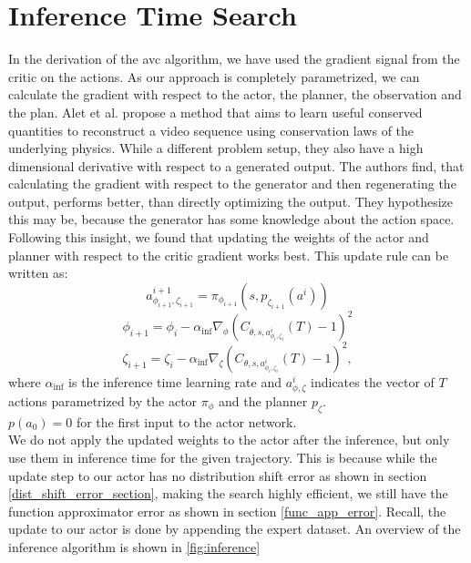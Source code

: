 \section{Inference Time Search}
\label{sec:inf_time_search}
In the derivation of the \ac{avc} algorithm, we have used the gradient signal from the critic on the actions. As our approach is completely parametrized, we can calculate 
the gradient with respect to the actor, the planner, the observation and the plan. Alet et al. \cite{alet2021noether} propose a method that aims 
to learn useful conserved quantities to reconstruct a video sequence 
using conservation laws of the underlying physics. While a different problem setup, they also have a high dimensional derivative with respect to a 
generated output. The authors find, that 
calculating the gradient with respect to the generator and then regenerating the output, performs better, than directly optimizing the output. They hypothesize this 
may be, because the generator has some knowledge about the action space. Following this insight, we found that updating the weights of the actor and planner 
with respect to the critic gradient works best. This update rule can be written as:
\begin{equation*}
    a^{i+1}_{\phi_{i+1}, \zeta_{i+1}} = \pi_{\phi_{i+1}}(s, p_{\zeta_{i+1}}(a^i))
\end{equation*}
\begin{equation*}
    \phi_{i+1} = \phi_i - \alpha_{\mathrm{inf}} \nabla_{\phi} (C_{\theta, s, a^{i}_{\phi_{i}, \zeta_{i}}}(T) - 1)^2
\end{equation*}
\begin{equation}
    \zeta_{i+1} = \zeta_i - \alpha_{\mathrm{inf}} \nabla_{\zeta} (C_{\theta, s, a^{i}_{\phi_{i}, \zeta_{i}}}(T) - 1)^2,
\end{equation}
where $\alpha_{\mathrm{inf}}$ is the inference time learning rate and $a^{i}_{\phi, \zeta}$ indicates the vector of $T$ actions parametrized by the 
actor $\pi_{\phi}$ and the planner $p_\zeta$.\\ 

$p(a_0) = 0$ for the first input to the actor network. \\

We do not apply the updated weights to the actor after the inference, but only use them in inference time for the given trajectory. This is because while the update step to our 
actor has no distribution shift error as shown in section \ref{dist_shift_error_section}, making the search highly efficient, we still have the function approximator error as 
shown in section \ref{func_app_error}. Recall, the update to our actor is done by appending the expert dataset. An overview of the inference 
algorithm is shown in \ref{fig:inference}

